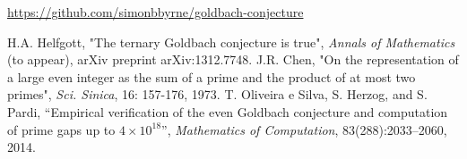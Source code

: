 \documentclass[11pt]{article}
\begin{document}
	\url{https://github.com/simonbbyrne/goldbach-conjecture}
	
	
	\begin{thebibliography}{9}
		 H.A. Helfgott, "The ternary Goldbach conjecture is true", \emph{Annals of Mathematics} (to appear), arXiv preprint arXiv:1312.7748.
		 J.R. Chen, "On the representation of a large even integer as the sum of a prime and the product of at most two primes", \emph{Sci. Sinica}, 16: 157-176, 1973.
		 T. Oliveira e Silva, S. Herzog, and S. Pardi, ``Empirical verification of the even Goldbach conjecture and computation of prime gaps up to \( 4 \times 10^{18} \)'', \emph{Mathematics of Computation}, 83(288):2033--2060, 2014.
	\end{thebibliography}
	
\end{document}
